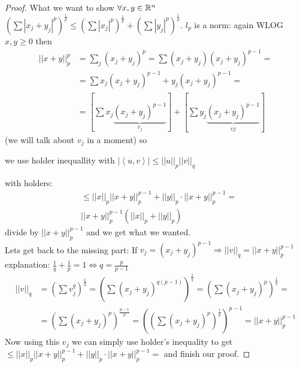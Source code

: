 \begin{claim}
\begin{proposition}
\end{proposition}

\begin{proof}
What we want to show $\forall x,y\in\mathbb{R}^{n}$ $\left(\sum\left|x_{j}+y_{j}\right|^{p}\right)^{\frac{1}{p}}\le\left(\sum\left|x_{j}\right|^{p}\right)^{\frac{1}{p}}+\left(\sum\left|y_{j}\right|^{p}\right)^{\frac{1}{p}}$.
$l_{p}$ is a norm: again WLOG $x,y\ge0$ then 
\begin{align*}
\left|\left|x+y\right|\right|_{p}^{p} & =\sum_{j}\left(x_{j}+y_{j}\right)^{p}=\sum\left(x_{j}+y_{j}\right)\left(x_{j}+y_{j}\right)^{p-1}=\\
 & =\sum x_{j}\left(x_{j}+y_{j}\right)^{p-1}+y_{j}\left(x_{j}+y_{j}\right)^{p-1}=\\
 & =\left[\sum x_{j}\underbrace{\left(x_{j}+y_{j}\right)^{p-1}}_{v_{j}}\right]+\left[\sum y_{j}\underbrace{\left(x_{j}+y_{j}\right)^{p-1}}_{vj}\right]
\end{align*}
 (we will talk about $v_{j}$ in a moment) so %
\begin{insight}
we use holder inequallity with $\left|\left\langle u,v\right\rangle \right|\le\left|\left|u\right|\right|_{p}\left|\left|v\right|\right|_{q}$%
\end{insight}
{} with holders: 
\begin{align*}
 & \le\left|\left|x\right|\right|_{p}\left|\left|x+y\right|\right|_{p}^{p-1}+\left|\left|y\right|\right|_{p}\cdot\left|\left|x+y\right|\right|_{p}^{p-1}=\\
 & \left|\left|x+y\right|\right|_{p}^{p-1}\left(\left|\left|x\right|\right|_{p}+\left|\left|y\right|\right|_{p}\right)
\end{align*}
divide by $\left|\left|x+y\right|\right|_{p}^{p-1}$ and we get what
we wanted.\\
Lets get back to the missing part: If $v_{j}=\left(x_{j}+y_{j}\right)^{p-1}\Rightarrow\left|\left|v\right|\right|_{q}=\left|\left|x+y\right|\right|_{p}^{p-1}$
explanation: $\frac{1}{q}+\frac{1}{p}=1\iff q=\frac{p}{p-1}$ 
\begin{align*}
\left|\left|v\right|\right|_{q} & =\left(\sum v_{j}^{q}\right)^{\frac{1}{q}}=\left(\sum\left(x_{j}+y_{j}\right)^{q\left(p-1\right)}\right)^{\frac{1}{q}}=\left(\sum\left(x_{j}+y_{j}\right)^{p}\right)^{\frac{1}{q}}=\\
 & =\left(\sum\left(x_{j}+y_{j}\right)^{p}\right)^{\frac{p-1}{p}}=\left(\left(\sum\left(x_{j}+y_{j}\right)^{p}\right)^{\frac{1}{p}}\right)^{p-1}=\left|\left|x+y\right|\right|_{p}^{p-1}
\end{align*}
 Now using this $v_{j}$ we can simply use holder's inequality to
get $\le\left|\left|x\right|\right|_{p}\left|\left|x+y\right|\right|_{p}^{p-1}+\left|\left|y\right|\right|_{p}\cdot\left|\left|x+y\right|\right|_{p}^{p-1}=$
and finish our proof.
\end{proof}
\end{claim}

